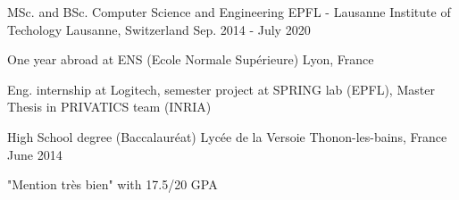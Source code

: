 


\begin{cventries}
	
\cventry
{MSc. and BSc. Computer Science and Engineering} %
{EPFL - Lausanne Institute of Techology} %
{Lausanne, Switzerland} %
{Sep. 2014 - July 2020} %
{ %
	\begin{cvitems}
		\item {One year abroad at ENS (Ecole Normale Supérieure) Lyon, France}
		\item {Eng. internship at Logitech, semester project at SPRING lab (EPFL), Master Thesis in PRIVATICS team (INRIA)}
	\end{cvitems}
}


\cventry
{High School degree (Baccalauréat)} %
{Lycée de la Versoie} %
{Thonon-les-bains, France} %
{June 2014} %
{ %
	\begin{cvitems}
		\item {"Mention très bien" with 17.5/20 GPA}
	\end{cvitems}
}


\end{cventries}